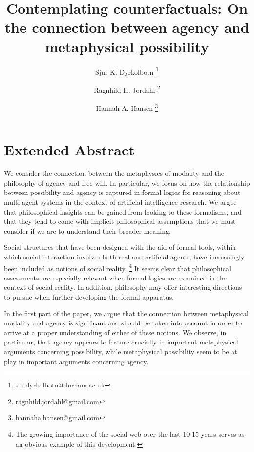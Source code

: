 \documentclass{article}
\begin{document}
\title{Contemplating counterfactuals: On the connection between agency and metaphysical possibility}
\author[1]{Sjur K. Dyrkolbotn \thanks{s.k.dyrkolbotn@durham.ac.uk}}
\author[2]{Ragnhild H. Jordahl \thanks{ragnhild.jordahl@gmail.com}}
\author[3]{Hannah A. Hansen \thanks{hannaha.hansen@gmail.com}}

\date{}
\maketitle

\section*{Extended Abstract}

We consider the connection between the metaphysics of modality and the philosophy of agency and free will.
In particular, we focus on how the relationship between possibility and agency is captured in formal logics for  reasoning about multi-agent systems in the context of artificial intelligence research. We argue that philosophical insights can be gained from looking to these formalisms, and that they tend to come with implicit philosophical assumptions that we must consider if we are to understand their broader meaning.

Social structures that have been designed with the aid of formal tools, within which social interaction involves both real and artifcial agents, have increasingly been included as notions of social reality. \footnote{The growing importance of the social web over the last 10-15 years serves as an obvious example of this development.} It seems clear that philosophical assessments are especially relevant when formal logics are examined in the context of social reality. In addition, philosophy may offer interesting directions to pursue when further developing the formal apparatus.

In the first part of the paper, we argue that the connection between metaphysical modality and agency is significant and should be taken into account in order to arrive at a proper understanding of either of these notions. We observe, in particular, that agency appears to feature crucially in important metaphysical arguments concerning possibility, while metaphysical possibility seem to be at play in important arguments concerning agency. 
\end{document}
